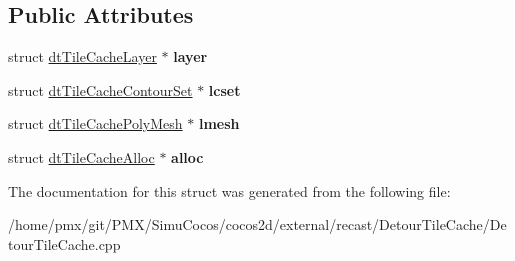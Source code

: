 \subsection*{Public Attributes}
\begin{DoxyCompactItemize}
\item 
\mbox{\label{structBuildContext_af13cd6322bec62c347af0349bef45cf6}} 
struct \hyperlink{structdtTileCacheLayer}{dt\+Tile\+Cache\+Layer} $\ast$ {\bfseries layer}
\item 
\mbox{\label{structBuildContext_a6fc8b619227dec71f622e2eff7ec42dc}} 
struct \hyperlink{structdtTileCacheContourSet}{dt\+Tile\+Cache\+Contour\+Set} $\ast$ {\bfseries lcset}
\item 
\mbox{\label{structBuildContext_a032ed845922a51bdd4614d57df090eec}} 
struct \hyperlink{structdtTileCachePolyMesh}{dt\+Tile\+Cache\+Poly\+Mesh} $\ast$ {\bfseries lmesh}
\item 
\mbox{\label{structBuildContext_ae04daa1bbed46060d43e59ff855c91e8}} 
struct \hyperlink{structdtTileCacheAlloc}{dt\+Tile\+Cache\+Alloc} $\ast$ {\bfseries alloc}
\end{DoxyCompactItemize}


The documentation for this struct was generated from the following file\+:\begin{DoxyCompactItemize}
\item 
/home/pmx/git/\+P\+M\+X/\+Simu\+Cocos/cocos2d/external/recast/\+Detour\+Tile\+Cache/Detour\+Tile\+Cache.\+cpp\end{DoxyCompactItemize}
